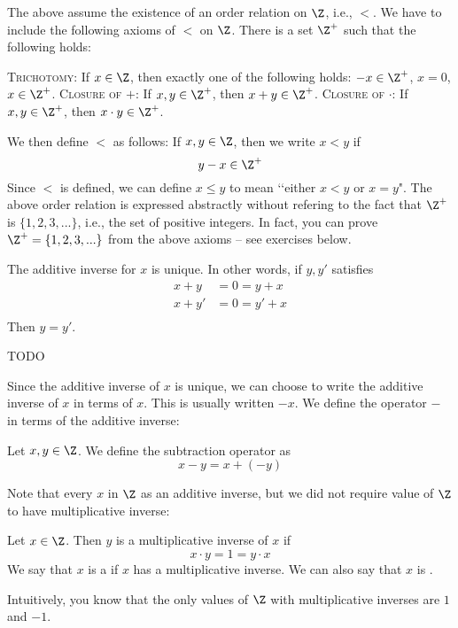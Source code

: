 The above assume the existence of an order relation on $\Z$, i.e., $<$.
We have to include the following axioms of $<$ on $\Z$.
There is a set $\Z^+$ such that the following holds:
\begin{enumerate}[nosep]
  \li \textsc{Trichotomy}: If $x \in \Z$, then exactly one of the following holds:
  $-x \in \Z^+$, $x = 0$, $x \in \Z^+$.
  \li \textsc{Closure of $+$}: If $x,y \in \Z^+$, then $x + y \in \Z^+$.
  \li \textsc{Closure of $\cdot$}: If $x,y \in \Z^+$, then $x \cdot y \in \Z^+$.
\end{enumerate}
We then define $<$ as follows: If $x, y \in \Z$, then we write $x < y$ if
\[
y - x \in \Z^+
\]
Since $<$ is defined, we can define $x \leq y$ to mean \lq\lq either $x < y$
or $x = y$".
The above order relation is expressed abstractly without refering to the fact that
$\Z^+$ is $\{1, 2, 3, ...\}$, i.e., the set of positive integers.
In fact, you can prove $\Z^+ = \{1, 2, 3, ...\}$ from the above axioms --
see exercises below.

\begin{prop}
  The additive inverse for $x$ is unique.
  In other words, if $y, y'$ satisfies
  \begin{align*}
    x + y &= 0 = y + x \\
    x + y' &= 0 = y' + x \\
  \end{align*}
  Then $y = y'$.
\end{prop}
\proof
TODO

Since the additive inverse of $x$ is unique, we can choose to write
the additive inverse of $x$ in terms of $x$.
This is usually written $-x$.
We define the operator $-$ in terms of the additive inverse:

\begin{defn}
  Let $x,y \in \Z$. We define the subtraction operator as
  \[
  x - y = x + (-y)
  \]
\end{defn}

Note that every $x$ in $\Z$ as an additive inverse, but we did not
require value of $\Z$ to have multiplicative inverse:

\begin{defn}
  Let $x \in \Z$. Then $y$ is a multiplicative inverse of $x$ if
  \[
  x\cdot y = 1 = y\cdot x
  \]
  We say that $x$ is a  if $x$ has a multiplicative inverse.
  We can also say that $x$ is .
\end{defn}

Intuitively, you know that the only values of $\Z$ with multiplicative inverses
are $1$ and $-1$.

